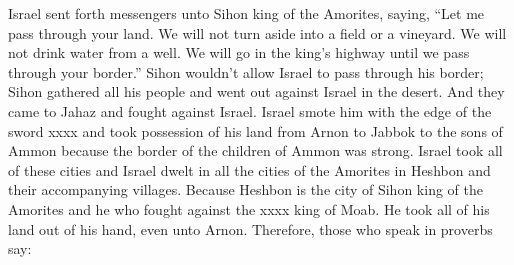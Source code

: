 \begin{inparaenum}
     Israel sent forth messengers unto Sihon king of the Amorites, saying,%
     ``Let me pass through your land. We will not turn aside into a field or a vineyard. We will not drink water from a well. We will go in the king's highway until we pass through your border.''%
     Sihon wouldn't allow Israel to pass through his border; Sihon gathered all his people and went out against Israel in the desert. And they came to Jahaz and fought against Israel.%
     Israel smote him with the edge of the sword xxxx and took possession of his land from Arnon to Jabbok to the sons of Ammon because the border of the children of Ammon was strong.%
     Israel took all of these cities and Israel dwelt in all the cities of the Amorites in Heshbon and their accompanying villages.%
     Because Heshbon is the city of Sihon king of the Amorites and he who fought against the xxxx king of Moab. He took all of his land out of his hand, even unto Arnon.%
     Therefore, those who speak in proverbs say:\smallskip%
    
    
    
    
    
    

\end{inparaenum}
